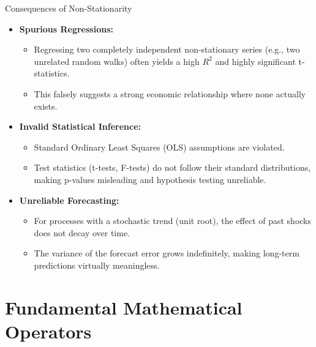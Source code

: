 \documentclass[aspectratio=169]{beamer}
\begin{document}
\begin{frame}{Consequences of Non-Stationarity}
\begin{itemize}
    \item \textbf{Spurious Regressions:} 
    \begin{itemize}
        \item Regressing two completely independent non-stationary series (e.g., two unrelated random walks) often yields a high $R^2$ and highly significant t-statistics.
        \item This falsely suggests a strong economic relationship where none actually exists.
    \end{itemize}
    
    \vspace{0.4cm}
    
    \item \textbf{Invalid Statistical Inference:}
    \begin{itemize}
        \item Standard Ordinary Least Squares (OLS) assumptions are violated.
        \item Test statistics (t-tests, F-tests) do not follow their standard distributions, making p-values misleading and hypothesis testing unreliable.
    \end{itemize}
    
    \vspace{0.4cm}
    
    \item \textbf{Unreliable Forecasting:}
    \begin{itemize}
        \item For processes with a stochastic trend (unit root), the effect of past shocks does not decay over time.
        \item The variance of the forecast error grows indefinitely, making long-term predictions virtually meaningless.
    \end{itemize}
\end{itemize}
\end{frame}

\section{Fundamental Mathematical Operators}
\end{document}
